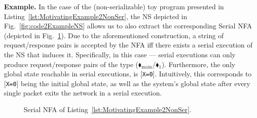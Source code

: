 \begin{enumerate}
	
\begin{tcolorbox}[colback=black!5!white, colframe=black, boxrule=1pt]
	\textbf{Example.} In the case of the (non-serializable) toy  program presented in Listing~\ref{lst:MotivatingExample2NonSer}, the NS depicted in Fig.~\ref{fig:code2ExampleNS} allows us to also extract the corresponding Serial NFA (depicted in Fig.~\ref{fig:code2ExampleNFA}).
	Due to the aforementioned construction, a string of request/response pairs is accepted by the NFA iff there exists a serial execution of the NS that induces it.
%
Specifically, in this case --- serial executions can only produce request/response pairs of the type ({\color{ForestGreen}$\blacklozenge_\text{main}$/{\color{red}$\blacklozenge_1$}}). Furthermore, the only global state reachable in serial executions, is [\texttt{X=0}]. 
	Intuitively, this corresponds to [\texttt{X=0}] being the initial global state, as well as the system's global state after every single packet exits the network in a serial execution.
	\end{tcolorbox}
	\begin{figure}[!htbp]
		\centering
		
		
		\caption{Serial NFA of Listing~\ref{lst:MotivatingExample2NonSer}.}
		\label{fig:code2ExampleNFA}
	\end{figure}
	

\end{enumerate}
